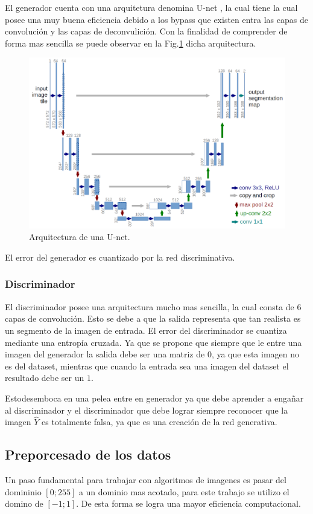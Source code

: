 \documentclass[]{IEEEtran}
\begin{document}
    El generador cuenta con una arquitetura denomina U-net \cite{U-Net}, la cual tiene 
    la cual posee una muy buena eficiencia debido a los bypass que existen entra las capas de convolución y 
    las capas de deconvulición. Con la finalidad de comprender de forma mas sencilla se puede observar 
    en la Fig.\ref{fig:u-net} dicha arquitectura.

    \begin{figure}
        \centering
        \includegraphics[width=.4\textwidth]{Imgs/u-net-architecture.png}
        \caption{Arquitectura de una U-net.}
        \label{fig:u-net}
    \end{figure}

    El error del generador es cuantizado por la red discriminativa.

    \subsubsection{Discriminador}

    El discriminador posee una arquitectura mucho mas sencilla, la cual consta de $6$ capas de convolución.
    Esto se debe a que la salida representa que tan realista es un segmento de la imagen de entrada. 
    El error del discriminador se cuantiza mediante una entropía cruzada. Ya que 
    se propone que siempre que le entre una imagen del generador la salida debe ser una matriz de $0$, ya que 
    esta imagen no es del dataset, mientras que cuando la entrada sea una imagen del dataset el resultado debe ser un $1$. 
    
    Estodesemboca en una pelea entre en generador ya que debe aprender a engañar al discriminador 
    y el discriminador que debe lograr siempre reconocer que la imagen $\hat{Y}$ es totalmente falsa, ya que es una 
    creación de la red generativa.
 
    \subsection{Preporcesado de los datos}

    Un paso fundamental para trabajar con algoritmos de imagenes es pasar del domininio $[0;255]$ a 
    un dominio mas acotado, para este trabajo se utilizo el domino de $[-1;1]$. De esta forma se logra 
    una mayor eficiencia computacional.
\end{document}
